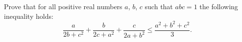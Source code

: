 Prove that for all positive real numbers $a$,  $b$,  $c$ such that $abc=1$ the following inequality holds:$$\frac{a}{2b+c^2}+\frac{b}{2c+a^2}+\frac{c}{2a+b^2}\le \frac{a^2+b^2+c^2}3.$$